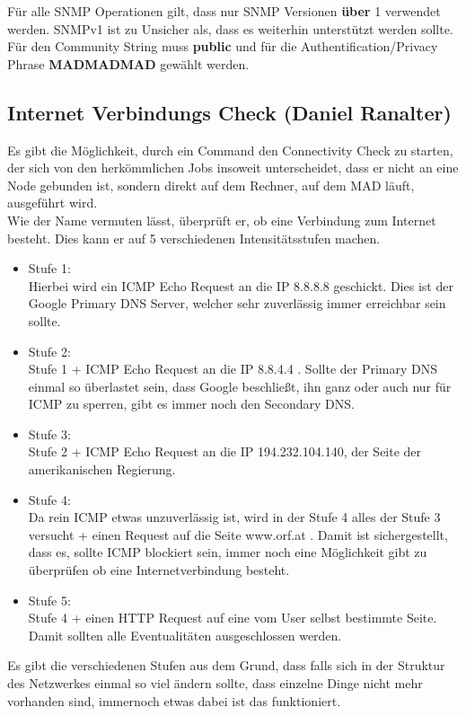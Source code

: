 \documentclass[12pt,a4paper]{report}
\begin{document}
\begin{onehalfspace}
Für alle SNMP Operationen gilt, dass nur SNMP Versionen \textbf{über} 1 verwendet werden. SNMPv1 ist zu Unsicher als, dass es weiterhin unterstützt werden sollte. Für den Community String muss \textbf{public} und für die Authentification/Privacy Phrase \textbf{MADMADMAD} gewählt werden. 

\subsection{Internet Verbindungs Check (Daniel Ranalter)}
Es gibt die Möglichkeit, durch ein Command den Connectivity Check zu starten, der sich von den herkömmlichen Jobs insoweit unterscheidet, dass er nicht an eine Node gebunden ist, sondern direkt auf dem Rechner, auf dem MAD läuft, ausgeführt wird.\\
Wie der Name vermuten lässt, überprüft er, ob eine Verbindung zum Internet besteht. Dies kann er auf 5 verschiedenen Intensitätsstufen machen.\\
\begin{itemize}
\item Stufe 1:\\
Hierbei wird ein ICMP Echo Request an die IP 8.8.8.8 geschickt. Dies ist der Google Primary DNS Server, welcher sehr zuverlässig immer erreichbar sein sollte.
\item Stufe 2:\\
Stufe 1 + ICMP Echo Request an die IP 8.8.4.4 . Sollte der Primary DNS einmal so überlastet sein, dass Google beschließt, ihn ganz oder auch nur für ICMP zu sperren, gibt es immer noch den Secondary DNS.
\item Stufe 3:\\
Stufe 2 + ICMP Echo Request an die IP 194.232.104.140, der Seite der amerikanischen Regierung. 
\item Stufe 4:\\
Da rein ICMP etwas unzuverlässig ist, wird in der Stufe 4 alles der Stufe 3 versucht + einen Request auf die Seite www.orf.at . Damit ist sichergestellt, dass es, sollte ICMP blockiert sein, immer noch eine Möglichkeit gibt zu überprüfen ob eine Internetverbindung besteht.
\item Stufe 5:\\
Stufe 4 + einen HTTP Request auf eine vom User selbst bestimmte Seite. Damit sollten alle Eventualitäten ausgeschlossen werden. 
\end{itemize}

Es gibt die verschiedenen Stufen aus dem Grund, dass falls sich in der Struktur des Netzwerkes einmal so viel ändern sollte, dass einzelne Dinge nicht mehr vorhanden sind, immernoch etwas dabei ist das funktioniert.


\end{onehalfspace}
\end{document}
